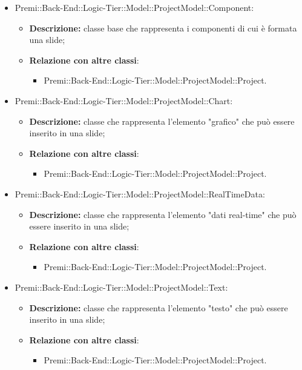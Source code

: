 \begin{itemize}
		\item Premi::Back-End::Logic-Tier::Model::ProjectModel::Component:
		\begin{itemize}
			\item \textbf{Descrizione:} classe base che rappresenta i componenti di cui è formata una \gls{slide};
			\item \textbf{Relazione con altre classi}:
			\begin{itemize}
				\item Premi::Back-End::Logic-Tier::Model::ProjectModel::Project.
			\end{itemize}
		\end{itemize}
		
		\item Premi::Back-End::Logic-Tier::Model::ProjectModel::Chart:
		\begin{itemize}
			\item \textbf{Descrizione:} classe che rappresenta l'elemento "grafico" che può essere inserito in una \gls{slide};
			\item \textbf{Relazione con altre classi}:
			\begin{itemize}
				\item Premi::Back-End::Logic-Tier::Model::ProjectModel::Project.
			\end{itemize}
		\end{itemize}
		
		\item Premi::Back-End::Logic-Tier::Model::ProjectModel::RealTimeData:
		\begin{itemize}
			\item \textbf{Descrizione:} classe che rappresenta l'elemento "dati real-time" che può essere inserito in una \gls{slide};
			\item \textbf{Relazione con altre classi}:
			\begin{itemize}
				\item Premi::Back-End::Logic-Tier::Model::ProjectModel::Project.
			\end{itemize}
		\end{itemize}
		
		\item Premi::Back-End::Logic-Tier::Model::ProjectModel::Text:
		\begin{itemize}
			\item \textbf{Descrizione:} classe che rappresenta l'elemento "testo" che può essere inserito in una \gls{slide};
			\item \textbf{Relazione con altre classi}:
			\begin{itemize}
				\item Premi::Back-End::Logic-Tier::Model::ProjectModel::Project.
			\end{itemize}
		\end{itemize}
		

\end{itemize}
